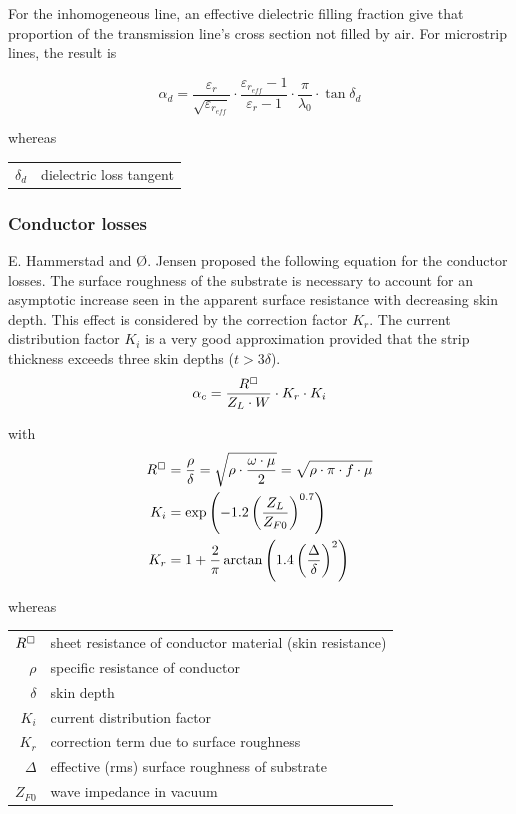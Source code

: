 \documentclass[10pt]{report}
\begin{document}
For the inhomogeneous line, an effective dielectric filling fraction
give that proportion of the transmission line's cross section not
filled by air.  For microstrip lines, the result is

\begin{equation}
\alpha_d = \dfrac{\varepsilon_r}{\sqrt{\varepsilon_{r_{eff}}}}\cdot \dfrac{\varepsilon_{r_{eff}} - 1}{\varepsilon_r - 1}\cdot \dfrac{\pi}{\lambda_0}\cdot \tan{\delta_d}
\end{equation}

whereas

\addvspace{12pt}

\begin{tabular}{rl}
$\delta_d$& dielectric loss tangent
\end{tabular}

\subsubsection{Conductor losses}

E. Hammerstad and {\O}. Jensen \cite{Hammerstad} proposed the following
equation for the conductor losses.  The surface roughness of the
substrate is necessary to account for an asymptotic increase seen in
the apparent surface resistance with decreasing skin depth.  This
effect is considered by the correction factor $K_r$.  The current
distribution factor $K_i$ is a very good approximation provided that
the strip thickness exceeds three skin depths ($t > 3\delta$).
\begin{equation}
\alpha_c = \dfrac{R^{\boxempty}}{Z_L \cdot W}\cdot K_r \cdot K_i
\end{equation}

with
\begin{align}
R^{\boxempty} &= \dfrac{\rho}{\delta} = \sqrt{\rho\cdot\dfrac{\omega \cdot \mu}{2}} = \sqrt{\rho\cdot\pi\cdot f \cdot \mu}\\
K_i &= \exp{\left(-1.2\left(\dfrac{Z_L}{Z_{F0}}\right)^{0.7}\right)}\\
K_r &= 1 + \dfrac{2}{\pi}\arctan{\left(1.4\left(\dfrac{\Delta}{\delta}\right)^2\right)}
\end{align}

whereas

\addvspace{12pt}

\begin{tabular}{rl}
$R^{\boxempty}$& sheet resistance of conductor material (skin resistance)\\
$\rho$& specific resistance of conductor\\
$\delta$& skin depth\\
$K_i$& current distribution factor\\
$K_r$& correction term due to surface roughness\\
$\Delta$& effective (rms) surface roughness of substrate\\
$Z_{F0}$& wave impedance in vacuum
\end{tabular}
\end{document}
